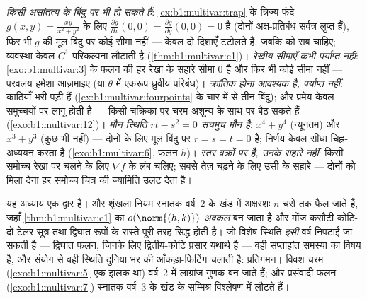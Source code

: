 \begin{remark}[आम फिसलनें]
\label{rem:b1:multivar:pitfalls}
\emph{ किसी असांतत्य के बिंदु पर भी हो सकते हैं}:
\cref{ex:b1:multivar:trap} के त्रिज्य फंदे $g(x,y) =
\frac{xy}{x^2+y^2}$ के लिए $\frac{\partial g}{\partial x}(0,0) =
\frac{\partial g}{\partial y}(0,0) = 0$ है (दोनों अक्ष-प्रतिबंध सर्वत्र
लुप्त हैं), फिर भी $g$ की मूल बिंदु पर कोई सीमा नहीं ---  केवल
दो दिशाएँ टटोलते हैं, जबकि  को सब चाहिए; व्यवस्था केवल $C^1$
परिकल्पना लौटाती है (\cref{thm:b1:multivar:c1})।
\emph{रेखीय सीमाएँ कभी पर्याप्त नहीं}: \cref{exo:b1:multivar:3} के फलन की
हर रेखा के सहारे सीमा $0$ है और फिर भी कोई सीमा नहीं --- परवलय हमेशा
आज़माइए (या $\theta$ में एकरूप ध्रुवीय परिबंध)।
\emph{क्रांतिक होना आवश्यक है, पर्याप्त नहीं}: काठियाँ भरी पड़ी हैं
(\cref{ex:b1:multivar:fourpoints} के चार में से तीन बिंदु); और प्रमेय केवल
\emph{} समुच्चयों पर लागू होती है --- किसी  चक्रिका पर चरम अशून्य
 के साथ  पर बैठ सकते हैं (\cref{exo:b1:multivar:12})।
\emph{मौन स्थिति $rt - s^2 = 0$ सचमुच मौन है}: $x^4 + y^4$ (न्यूनतम) और
$x^3 + y^3$ (कुछ भी नहीं) --- दोनों के लिए मूल बिंदु पर $r = s = t = 0$ है;
निर्णय केवल सीधा चिह्न-अध्ययन करता है (\cref{exo:b1:multivar:6}, फलन $h$)।
\emph{ स्तर वक्रों पर  है, उनके सहारे नहीं}: किसी समोच्च
रेखा पर चलने के लिए $\nabla f$ के लंब चलिए; सबसे तेज़ चढ़ने के लिए उसी के
सहारे --- दोनों को मिला देना हर समोच्च चित्र की ज्यामिति उलट देता है।
\end{remark}

\begin{remark}[दो चर किधर ले जाते हैं]
\label{rem:b1:multivar:whereused}
यह अध्याय एक द्वार है।  और शृंखला नियम स्नातक वर्ष~2 के खंड में
अक्षरशः $n$ चरों तक फैल जाते हैं, जहाँ \cref{thm:b1:multivar:c1} का
$o(\norm{(h,k)})$ \emph{अवकल} बन जाता है और मोंज कसौटी कोटि-दो टेलर सूत्र
तथा द्विघात रूपों के रास्ते पूरी तरह सिद्ध होती है। जो विशेष स्थिति
\emph{इसी} वर्ष निपटाई जा सकती है --- द्विघात फलन, जिनके लिए द्वितीय-कोटि
प्रसार यथार्थ है --- वही सप्ताहांत समस्या का विषय है, और संयोग से वही
स्थिति दुनिया भर की आँकड़ा-फिटिंग चलाती है:  प्रतिगमन। विवश
चरम (\cref{exo:b1:multivar:5} एक झलक था) वर्ष~2 में लाग्रांज गुणक बन जाते
हैं; और प्रसंवादी फलन (\cref{exo:b1:multivar:7}) स्नातक वर्ष~3 के खंड के
सम्मिश्र विश्लेषण में लौटते हैं।
\end{remark}

